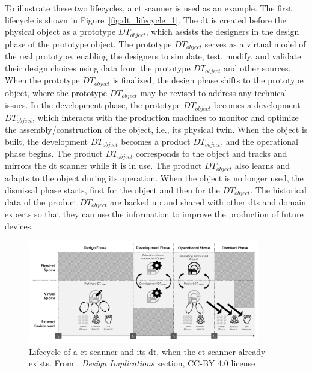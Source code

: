 To illustrate these two lifecycles, a \acrfull{ct} scanner is used as an example. The first lifecycle is shown in Figure~\ref{fig:dt_lifecycle_1}. The \acrshort{dt} is created before the physical object as a prototype \(DT_{object}\), which assists the designers in the design phase of the prototype object. The prototype \(DT_{object}\) serves as a virtual model of the real prototype, enabling the designers to simulate, test, modify, and validate their design choices using data from the prototype \(DT_{object}\) and other sources. When the prototype \(DT_{object}\) is finalized, the design phase shifts to the prototype object, where the prototype \(DT_{object}\) may be revised to address any technical issues. In the development phase, the prototype \(DT_{object}\) becomes a development \(DT_{object}\), which interacts with the production machines to monitor and optimize the assembly/construction of the object, i.e., its physical twin. When the object is built, the development \(DT_{object}\) becomes a product \(DT_{object}\), and the operational phase begins. The product \(DT_{object}\) corresponds to the object and tracks and mirrors the \acrshort{dt} scanner while it is in use. The product \(DT_{object}\) also learns and adapts to the object during its operation. When the object is no longer used, the dismissal phase starts, first for the object and then for the \(DT_{object}\). The historical data of the product \(DT_{object}\) are backed up and shared with other \acrshort{dt}s and domain experts so that they can use the information to improve the production of future devices.

\begin{figure}
    \centering
    \includegraphics[width=0.9\textwidth]{images/digital_twins/dt_lifecycle_2.png}
    \caption[Lifecycle of a \acrshort{ct} scanner and its \acrshort{dt}, when the \acrshort{ct} scanner already exists]{Lifecycle of a \acrshort{ct} scanner and its \acrshort{dt}, when the \acrshort{ct} scanner already exists. From \textcite{barricelliSurveyDigitalTwin2019}, \textit{Design Implications} section, CC-BY 4.0 license}%
    \label{fig:dt_lifecycle_2}
\end{figure}

